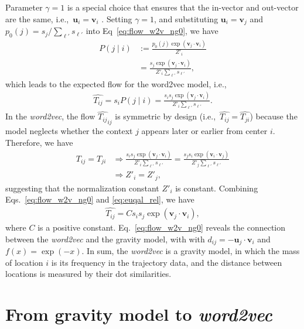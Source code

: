 \documentclass[12pt]{article} %
\def\given{\mid}
\def\ie{i.e.,~}
\begin{document}
Parameter $\gamma=1$ is a special choice that ensures that the in-vector and out-vector are the same, \ie $\bm{u}_i = \bm{v}_i$ \autocite{levy2014neural}.
Setting $\gamma = 1$, and substituting $\bm{u}_i = \bm{v}_j$ and $p_0(j) = s_j / \sum_{\ell'} s_{\ell'}$ into Eq~\eqref{eq:flow_w2v_ng0}, we have
\begin{align}
    P\left(j \given i \right) & := \frac{ p_0 (j) \exp(\bm{v}_j \cdot \bm{v}_{i})}{ Z'_i}                      \\
                              & =  \frac{s _j  \exp(\bm{v}_j \cdot \bm{v}_{i})}{ Z' _i\sum_{\ell'} s_{\ell'}},
\end{align}
which leads to the expected flow for the word2vec model, \ie
\begin{align}
    \hat{T_{ij}}=s_i P(j\given i) =  \frac{s_i s _j  \exp(\bm{v}_j \cdot \bm{v}_{i})}{  Z'_i\sum_{\ell'} s_{\ell'}}. \label{eq:flow_w2v_ng0}
\end{align}
In the \textit{word2vec}, the flow $\hat{T_{ij}}_{ij}$ is symmetric by design (\ie $\hat{T_{ij}}=\hat{T_{ji}}$) because the model neglects whether the context $j$ appears later or earlier from center $i$.
Therefore, we have
\begin{align}
    T_{ij} = T_{ji}
     & \Rightarrow
    \frac{s_i s _j  \exp(\bm{v}_j \cdot \bm{v}_{i})}{  Z'_i\sum_{\ell'} s_{\ell'}} =  \frac{s_j s _i  \exp(\bm{v}_i \cdot \bm{v}_{j})}{  Z'_j\sum_{\ell'} s_{\ell'}} \\
     & \Rightarrow
    Z'_i = Z'_j, \label{eq:euqal_rel}
\end{align}
suggesting that the normalization constant $Z' _i$ is constant.
Combining Eqs.~\eqref{eq:flow_w2v_ng0} and \eqref{eq:euqal_rel}, we have
\begin{align}
    \hat{T_{ij}}=  C s_i s _j  \exp(\bm{v}_j \cdot \bm{v}_{i}),
\end{align}
where $C$ is a positive constant.
Eq.~\eqref{eq:flow_w2v_ng0} reveals the connection between the \textit{word2vec} and the gravity model, with with $d_{ij} = - \bm{u}_{j} \cdot \bm{v}_{i}$ and $f(x) = \exp(-x)$.
In sum, the \textit{word2vec} is a gravity model, in which the mass of location $i$ is its frequency in the trajectory data, and the distance between locations is measured by their dot similarities.

\section{From gravity model to \textit{word2vec}}
\label{sec:from_gravity_to_word2vec}
\end{document}
